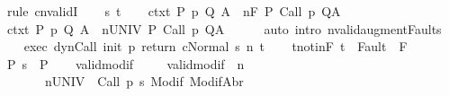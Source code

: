 \begin{isabellebody}
%
\isatagproof
{}\isamarkupfalse%
\ {\isacharparenleft}rule\ cnvalidI{\isacharparenright}\isanewline
\ \ \isamarkupfalse%
\ s\ t\isanewline
\ \ \isamarkupfalse%
\ ctxt{\isacharcolon}\ {\isachardoublequoteopen}{\isasymforall}{\isacharparenleft}P{\isacharcomma}\ p{\isacharcomma}\ Q{\isacharcomma}\ A{\isacharparenright}{\isasymin}{\isasymTheta}{\isachardot}\ {\isasymGamma}\ {\isasymTurnstile}n{\isacharcolon}\isactrlbsub {\isacharslash}F\isactrlesub \ P\ {\isacharparenleft}Call\ p{\isacharparenright}\ Q{\isacharcomma}A{\isachardoublequoteclose}\isanewline
\ \ \isamarkupfalse%
\ \isamarkupfalse%
\ ctxt{\isacharprime}{\isacharcolon}\ {\isachardoublequoteopen}{\isasymforall}{\isacharparenleft}P{\isacharcomma}\ p{\isacharcomma}\ Q{\isacharcomma}\ A{\isacharparenright}{\isasymin}{\isasymTheta}{\isachardot}\ {\isasymGamma}\ {\isasymTurnstile}n{\isacharcolon}\isactrlbsub {\isacharslash}UNIV\isactrlesub \ P\ {\isacharparenleft}Call\ p{\isacharparenright}\ Q{\isacharcomma}A{\isachardoublequoteclose}\isanewline
\ \ \ \ \isamarkupfalse%
\ {\isacharparenleft}auto\ intro{\isacharcolon}\ nvalid{\isacharunderscore}augment{\isacharunderscore}Faults{\isacharparenright}\isanewline
\ \ \isamarkupfalse%
\ exec{\isacharcolon}\ {\isachardoublequoteopen}{\isasymGamma}{\isasymturnstile}{\isasymlangle}dynCall\ init\ p\ return\ c{\isacharcomma}Normal\ s{\isasymrangle}\ {\isacharequal}n{\isasymRightarrow}\ t{\isachardoublequoteclose}\isanewline
\ \ \isamarkupfalse%
\ t{\isacharunderscore}notin{\isacharunderscore}F{\isacharcolon}\ {\isachardoublequoteopen}t\ {\isasymnotin}\ Fault\ {\isacharbackquote}\ F{\isachardoublequoteclose}\isanewline
\ \ \isamarkupfalse%
\ P{\isacharcolon}\ {\isachardoublequoteopen}s\ {\isasymin}\ P{\isachardoublequoteclose}\isanewline
\ \ \isamarkupfalse%
\ valid{\isacharunderscore}modif\ \isanewline
\ \ \isamarkupfalse%
\ valid{\isacharunderscore}modif{\isacharprime}{\isacharcolon}\ {\isachardoublequoteopen}{\isasymforall}{\isasymsigma}{\isachardot}\ {\isasymforall}n{\isachardot}\ \isanewline
\ \ \ \ \ \ \ {\isasymGamma}{\isacharcomma}{\isasymTheta}{\isasymTurnstile}n{\isacharcolon}\isactrlbsub {\isacharslash}UNIV\isactrlesub \ {\isacharbraceleft}{\isasymsigma}{\isacharbraceright}\ Call\ {\isacharparenleft}p\ s{\isacharparenright}\ {\isacharparenleft}Modif\ {\isasymsigma}{\isacharparenright}{\isacharcomma}{\isacharparenleft}ModifAbr\ {\isasymsigma}{\isacharparenright}{\isachardoublequoteclose}\isanewline

\end{isabellebody}
